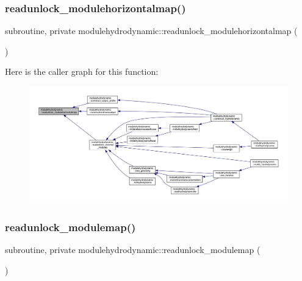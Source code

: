 \subsubsection{\texorpdfstring{readunlock\+\_\+modulehorizontalmap()}{readunlock\_modulehorizontalmap()}}
{\footnotesize\ttfamily subroutine, private modulehydrodynamic\+::readunlock\+\_\+modulehorizontalmap (\begin{DoxyParamCaption}{ }\end{DoxyParamCaption})\hspace{0.3cm}{\ttfamily [private]}}

Here is the caller graph for this function\+:\nopagebreak
\begin{figure}[H]
\begin{center}
\leavevmode
\includegraphics[width=350pt]{namespacemodulehydrodynamic_af77f71622ac304600bd312437b8af339_icgraph}
\end{center}
\end{figure}
\mbox{\label{namespacemodulehydrodynamic_a5265f8f84b5dfafbb654e42da68f00af}} 
\subsubsection{\texorpdfstring{readunlock\+\_\+modulemap()}{readunlock\_modulemap()}}
{\footnotesize\ttfamily subroutine, private modulehydrodynamic\+::readunlock\+\_\+modulemap (\begin{DoxyParamCaption}{ }\end{DoxyParamCaption})\hspace{0.3cm}{\ttfamily [private]}}

